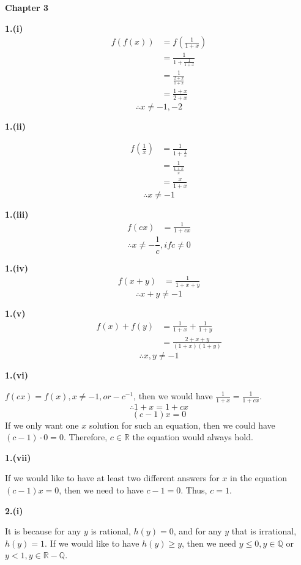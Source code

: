 \documentclass[a4paper,12pt]{report}
\begin{document}
\pagebreak
\noindent
\textbf{Chapter 3}

\noindent
\textbf{1.(i)}
\begin{align*}
f(f(x))
&=f(\frac{1}{1+x})\\
&=\frac{1}{1+\frac{1}{1+x}}\\
&=\frac{1}{\frac{2+x}{1+x}}\\
&=\frac{1+x}{2+x}
\end{align*}
\[\therefore x\neq -1,-2\]

\noindent
\textbf{1.(ii)}

\begin{align*}
f(\frac{1}{x})
&=\frac{1}{1+\frac{1}{x}}\\
&=\frac{1}{\frac{1+x}{x}}\\
&=\frac{x}{1+x}
\end{align*}
\[\therefore x\neq -1\]

\noindent
\textbf{1.(iii)}
\begin{align*}
f(cx)
&=\frac{1}{1+cx}
\end{align*}
\[\therefore x\neq -\frac{1}{c}, if c\neq 0\]

\noindent
\textbf{1.(iv)}
\begin{align*}
f(x+y)
&=\frac{1}{1+x+y}
\end{align*}
\[\therefore x+y\neq -1\]

\noindent
\textbf{1.(v)}
\begin{align*}
f(x)+f(y)
&=\frac{1}{1+x}+\frac{1}{1+y}\\
&=\frac{2+x+y}{(1+x)(1+y)}
\end{align*}
\[\therefore x,y\neq -1\]

\noindent
\textbf{1.(vi)}

\noindent
$f(cx)=f(x), x\neq -1, or -c^{-1}$, then we would have $\frac{1}{1+x}=\frac{1}{1+cx}$.
\[\therefore 1+x=1+cx\]
\[(c-1)x=0\]
If we only want one $x$ solution for such an equation, then we could have $(c-1)\cdot{0}=0$. Therefore, $c\in \mathbb{R}$ the equation would always hold. 

\noindent
\textbf{1.(vii)}

\noindent
If we would like to have at least two different answers for $x$ in the equation $(c-1)x=0$, then we need to have $c-1=0$. Thus, $c=1$. 

\noindent
\textbf{2.(i)}

\noindent
It is because for any $y$ is rational, $h(y)= 0$, and for any $y$ that is irrational, $h(y)=1$. If we would like to have $h(y)\geq y$, then we need $y\leq0, y\in \mathbb{Q}$ or $y<1, y \in \mathbb{R-Q}$.
\end{document}

